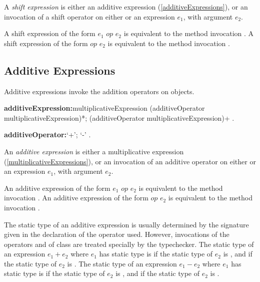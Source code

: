 \documentclass{article}
\begin{document}
\LMHash{}
A {\em shift expression} is either an additive expression (\ref{additiveExpressions}), or an invocation of a shift operator on either \SUPER{} or an expression $e_1$, with argument $e_2$.

\LMHash{}
A shift expression of the form $e_1$ $op$ $e_2$ is equivalent to the method invocation .
A shift expression of the form \SUPER{} $op$ $e_2$ is equivalent to the method invocation .



\subsection{Additive Expressions}

\LMHash{}
Additive expressions invoke the addition operators on objects.

\begin{grammar}
{\bf additiveExpression:}multiplicativeExpression
  \gnewline{} (additiveOperator multiplicativeExpression)*;
  \SUPER{} (additiveOperator multiplicativeExpression)+
  .

{\bf additiveOperator:}`+';
  `-'
  .
\end{grammar}

\LMHash{}
An {\em additive expression} is either a multiplicative expression (\ref{multiplicativeExpressions}), or an invocation of an additive operator on either \SUPER{} or an expression $e_1$, with argument $e_2$.

\LMHash{}
An additive expression of the form $e_1$ $op$ $e_2$ is equivalent to the method invocation .
An additive expression of the form \SUPER{} $op$ $e_2$ is equivalent to the method invocation .

\LMHash{}
The static type of an additive expression is usually determined by the signature given in the declaration of the operator used.
However, invocations of the operators \code{+} and \code{-} of class  are treated specially by the typechecker.
The static type of an expression $e_1 + e_2$ where $e_1$ has static type  is  if the static type of $e_2$ is , and  if the static type of $e_2$ is .
The static type of an expression $e_1 - e_2$ where $e_1$ has static type  is  if the static type of $e_2$ is , and  if the static type of $e_2$ is .
\end{document}
